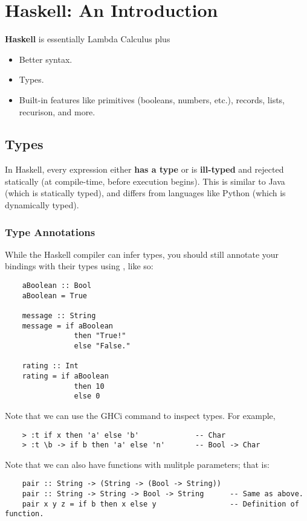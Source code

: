 \documentclass[letterpaper]{article}
\begin{document}
\section{Haskell: An Introduction}
\textbf{Haskell} is essentially Lambda Calculus plus
\begin{itemize}
    \item Better syntax. 
    \item Types.
    \item Built-in features like primitives (booleans, numbers, etc.), records, lists, recurison, and more.
\end{itemize}

\subsection{Types}
In Haskell, every expression either \textbf{has a type} or is \textbf{ill-typed} and rejected statically (at compile-time, before execution begins). This is similar to Java (which is statically typed), and differs from languages like Python (which is dynamically typed).

\subsubsection{Type Annotations}
While the Haskell compiler can infer types, you should still annotate your bindings with their types using \code{::}, like so: 
\begin{verbatim}
    aBoolean :: Bool 
    aBoolean = True 

    message :: String 
    message = if aBoolean
                then "True!"
                else "False."

    rating :: Int 
    rating = if aBoolean
                then 10 
                else 0
\end{verbatim}
Note that we can use the GHCi command  to inspect types. For example, 
\begin{verbatim}
    > :t if x then 'a' else 'b'             -- Char 
    > :t \b -> if b then 'a' else 'n'       -- Bool -> Char 
\end{verbatim}
Note that we can also have functions with mulitple parameters; that is:
\begin{verbatim}
    pair :: String -> (String -> (Bool -> String))  
    pair :: String -> String -> Bool -> String      -- Same as above. 
    pair x y z = if b then x else y                 -- Definition of function.
\end{verbatim}
\end{document}
